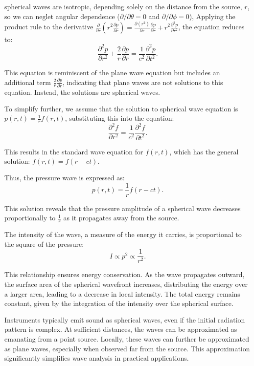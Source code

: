 \documentclass[a4paper]{article}
\begin{document}
spherical waves are isotropic, depending solely on the distance from the source, \( r \), so we can neglet angular dependence (\( \partial / \partial \theta = 0 \) and \( \partial / \partial \phi = 0 \)), Applying the product rule to the derivative \( 
\frac{\partial}{\partial r} \left( r^2 \frac{\partial p}{\partial r} \right) = \frac{\partial (r^2)}{\partial r} \frac{\partial p}{\partial r} + r^2 \frac{\partial^2 p}{\partial r^2}
\), the equation reduces to:
\[
\frac{\partial^2 p}{\partial r^2} + \frac{2}{r} \frac{\partial p}{\partial r} = \frac{1}{c^2} \frac{\partial^2 p}{\partial t^2}.
\]

This equation is reminiscent of the plane wave equation but includes an additional term \( \frac{2}{r} \frac{\partial p}{\partial r} \), indicating that plane waves are not solutions to this equation. Instead, the solutions are spherical waves.

To simplify further, we assume that the solution to spherical wave equation is \( p(r, t) = \frac{1}{r} f(r, t) \), substituting this into the equation:
\[
\frac{\partial^2 f}{\partial r^2} = \frac{1}{c^2} \frac{\partial^2 f}{\partial t^2}.
\]

This results in the standard wave equation for \( f(r, t) \), which has the general solution:
\(
f(r, t) = f(r - ct).
\)

Thus, the pressure wave is expressed as:
\[
p(r, t) = \frac{1}{r} f(r - ct).
\]

This solution reveals that the pressure amplitude of a spherical wave decreases proportionally to \( \frac{1}{r} \) as it propagates away from the source.


The intensity of the wave, a measure of the energy it carries, is proportional to the square of the pressure:
\[
I \propto p^2 \propto \frac{1}{r^2}.
\]

This relationship ensures energy conservation. As the wave propagates outward, the surface area of the spherical wavefront increases, distributing the energy over a larger area, leading to a decrease in local intensity. The total energy remains constant, given by the integration of the intensity over the spherical surface.

Instruments typically emit sound as spherical waves, even if the initial radiation pattern is complex. At sufficient distances, the waves can be approximated as emanating from a point source. Locally, these waves can further be approximated as plane waves, especially when observed far from the source. This approximation significantly simplifies wave analysis in practical applications.
\end{document}
